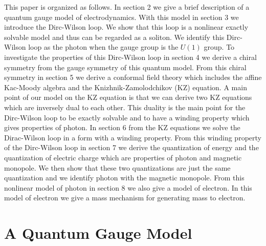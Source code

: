 \documentclass[a4paper,a4paper]{article}
\begin{document}
This paper is organized as follows. In section 2
we give a brief description of a quantum gauge model
of electrodynamics. With this  model in section 3 we
introduce the Dirc-Wilson loop.  We show that this loop is a nonlinear 
exactly solvable model and thus can be regarded as a soliton. We identify this Dirc-Wilson loop as the photon when the gauge group is the $U(1)$ group. To investigate the properties of 
this Dirc-Wilson loop in section 4 we derive a chiral symmetry from
the gauge symmetry of this quantum  model.
From this chiral symmetry in section 5 we derive a conformal field theory which includes the affine Kac-Moody algebra
and the Knizhnik-Zamolodchikov (KZ) equation. A main point of our model on the KZ equation is that we can derive two KZ equations
which are inversely dual to each other. This duality is the main point for the Dirc-Wilson loop to be exactly solvable and to have a winding property which gives properties of photon. 
In section 6 from the KZ equations  we solve the  Dirac-Wilson loop in a form with a winding property.
 From this winding property of the Dirc-Wilson loop in section 7 we derive the quantization of energy and the quantization of electric charge which are properties of photon and magnetic monopole. We then show that these two quantizations are just the same quantization and we identify photon with the magnetic monopole.  From this nonlinear model of photon in section 8 we also give a model of electron. In this model of electron we give a mass mechanism for generating mass to electron. 

\section{A Quantum Gauge Model}\label{sec2}
\end{document}
